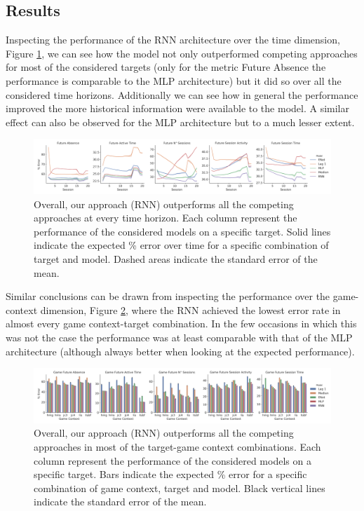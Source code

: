 \subsection{Results}
\label{results_2}
Inspecting the performance of the RNN architecture over the time dimension, Figure \ref{model_comp_coll_game_32}, we can see how the model not only outperformed competing approaches for most of the considered targets (only for the metric Future Absence the performance is comparable to the MLP architecture) but it did so over all the considered time horizons. Additionally we can see how in general the performance improved the more historical information were available to the model. A similar effect can also be observed for the MLP architecture but to a much lesser extent.
\begin{figure}[h]
\centering
\includegraphics[width=\textwidth]{images/chapter_3/models_comparison_collapsed_game_32.png}
\caption[\textbf{Model comparison collapsing over game context}]{ Overall, our approach (RNN) outperforms all the competing approaches at every time horizon. Each column represent the performance of the considered models on a specific target. Solid lines indicate the expected \% error over time for a specific combination of target and model. Dashed areas indicate the standard error of the mean.}
\label{model_comp_coll_game_32}
\end{figure}
Similar conclusions can be drawn from inspecting the performance over the game-context dimension, Figure \ref{model_comp_coll_time_32}, where the RNN achieved the lowest error rate in almost every game context-target combination. In the few occasions in which this was not the case the performance was at least comparable with that of the MLP architecture (although always better when looking at the expected performance).
\begin{figure}[h]
\centering
\includegraphics[width=\textwidth]{images/chapter_3/models_comparison_collapsed_time_32.png}
\caption[\textbf{Model comparison collapsing over time}]{ Overall, our approach (RNN) outperforms all the competing approaches in most of the target-game context combinations. Each column represent the performance of the considered models on a specific target. Bars indicate the expected \% error for a specific combination of game context, target and model. Black vertical lines indicate the standard error of the mean.}
\label{model_comp_coll_time_32} 
\end{figure}
